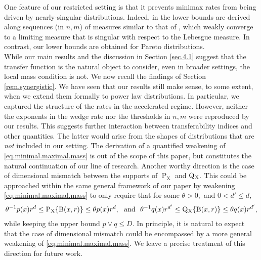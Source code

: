 \documentclass[10pt]{article}
\newcommand{\B}{\operatorname{B}}
\renewcommand{\P}{\operatorname{P}}
\newcommand{\Q}{\operatorname{Q}}
\newcommand{\sX}{\mathrm{X}}
\begin{document}
One feature of our restricted setting is that it prevents minimax rates from being driven by nearly-singular distributions. Indeed, in \cite{kpotufe2021marginal, pathak2022new, trottner2024covariate} the lower bounds are derived along sequences (in $n, m$) of measures similar to that of \cite[Part III]{kahane1969trois}, which weakly converge to a limiting measure that is singular with respect to the Lebesgue measure. In contrast, our lower bounds are obtained for Pareto distributions.\\

While our main results and the discussion in Section \ref{sec.4.1} suggest that the transfer function is the natural object to consider, even in broader settings, the local mass condition is not. We now recall the findings of Section \ref{rem.synergistic}. We have seen that our results still make sense, to some extent, when we extend them formally to power law distributions. In particular, we captured the structure of the rates in the accelerated regime. However, neither the exponents in the wedge rate nor the thresholds in $n,m$ were reproduced by our results. This suggests further interaction between transferability indices and other quantities. The latter would arise from the shapes of distributions that are \textit{not} included in our setting. The derivation of a quantified weakening of \eqref{eq.minimal.maximal.mass} is out of the scope of this paper, but constitutes the natural continuation of our line of research. Another worthy direction is the case of dimensional mismatch between the supports of $\P_{\sX}$ and $\Q\mathstrut_{\!\sX}.$ This could be approached within the same general framework of our paper by weakening \eqref{eq.minimal.maximal.mass} to only require that for some $\theta > 0,$ and $0 < d' \leq d,$
\begin{align*}
    \theta^{-1}p(x)r^d \leq \P_{\sX}\{\B(x, r)\} \leq \theta p(x)r^d, \ \text{ and } \ \theta^{-1}q(x)r^{d'} \leq \Q\mathstrut_{\!\sX}\{\B(x, r)\} \leq \theta q(x) r^{d'},
\end{align*}
while keeping the upper bound $p\vee q \leq D.$ In principle, it is natural to expect that the case of dimensional mismatch could be encompassed by a more general weakening of \eqref{eq.minimal.maximal.mass}. We leave a precise treatment of this direction for future work.



\printbibliography


\newpage 


\appendix
\end{document}

